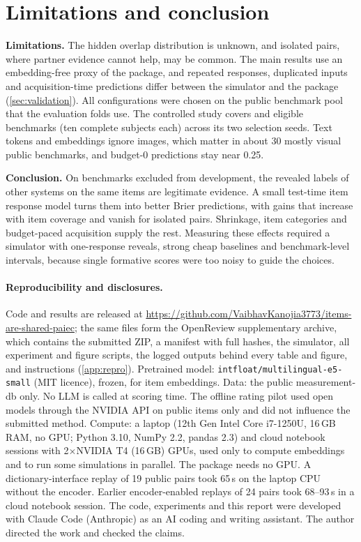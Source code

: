 \documentclass{article}
\begin{document}
\section{Limitations and conclusion}
\textbf{Limitations.}
The hidden overlap distribution is unknown, and isolated pairs, where partner evidence cannot help, may be common.
The main results use an embedding-free proxy of the package, and repeated responses, duplicated inputs and acquisition-time predictions differ between the simulator and the package (\cref{sec:validation}).
All configurations were chosen on the public benchmark pool that the evaluation folds use.
The controlled study covers \ovNb{} and \ovNbB{} eligible benchmarks (ten complete subjects each) across its two selection seeds.
Text tokens and embeddings ignore images, which matter in about 30 mostly visual public benchmarks, and budget-0 predictions stay near 0.25.

\textbf{Conclusion.}
On benchmarks excluded from development, the revealed labels of other systems on the same items are legitimate evidence. A small test-time item response model turns them into better Brier predictions, with gains that increase with item coverage and vanish for isolated pairs. Shrinkage, item categories and budget-paced acquisition supply the rest. Measuring these effects required a simulator with one-response reveals, strong cheap baselines and benchmark-level intervals, because single formative scores were too noisy to guide the choices.

\paragraph{Reproducibility and disclosures.}
Code and results are released at \url{https://github.com/VaibhavKanojia3773/items-are-shared-paiec}; the same files form the OpenReview supplementary archive, which contains the submitted ZIP, a manifest with full hashes, the simulator, all experiment and figure scripts, the logged outputs behind every table and figure, and instructions (\cref{app:repro}).
Pretrained model: \texttt{intfloat/multilingual-e5-small} (MIT licence), frozen, for item embeddings. Data: the public measurement-db only. No LLM is called at scoring time. The offline rating pilot used open models through the NVIDIA API on public items only and did not influence the submitted method.
Compute: a laptop (12th Gen Intel Core i7-1250U, 16\,GB RAM, no GPU; Python 3.10, NumPy 2.2, pandas 2.3) and cloud notebook sessions with 2$\times$NVIDIA T4 (16\,GB) GPUs, used only to compute embeddings and to run some simulations in parallel. The package needs no GPU. A dictionary-interface replay of 19 public pairs took 65\,s on the laptop CPU without the encoder. Earlier encoder-enabled replays of 24 pairs took 68--93\,s in a cloud notebook session.
The code, experiments and this report were developed with Claude Code (Anthropic) as an AI coding and writing assistant. The author directed the work and checked the claims.
\end{document}

